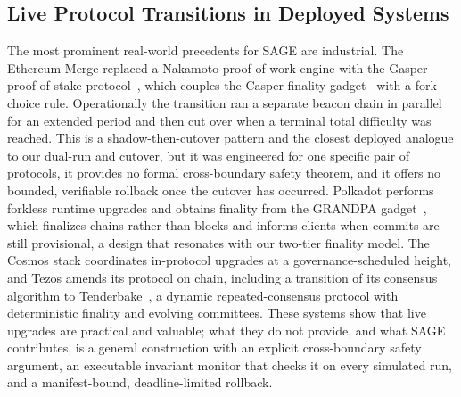 \documentclass[journal]{IEEEtran}
\theoremstyle{remark}
\begin{document}
\subsection{Live Protocol Transitions in Deployed Systems}
The most prominent real-world precedents for SAGE are industrial. The Ethereum Merge
replaced a Nakamoto proof-of-work engine with the Gasper proof-of-stake
protocol~\cite{gasper}, which couples the Casper finality gadget~\cite{casperffg} with a
fork-choice rule. Operationally the transition ran a separate beacon chain in parallel for
an extended period and then cut over when a terminal total difficulty was reached. This is a
shadow-then-cutover pattern and the closest deployed analogue to our dual-run and cutover,
but it was engineered for one specific pair of protocols, it provides no formal
cross-boundary safety theorem, and it offers no bounded, verifiable rollback once the cutover
has occurred. Polkadot performs forkless runtime upgrades and obtains finality from the
GRANDPA gadget~\cite{grandpa}, which finalizes chains rather than blocks and informs clients
when commits are still provisional, a design that resonates with our two-tier finality model.
The Cosmos stack coordinates in-protocol upgrades at a governance-scheduled height, and Tezos
amends its protocol on chain, including a transition of its consensus algorithm to
Tenderbake~\cite{tenderbake}, a dynamic repeated-consensus protocol with deterministic
finality and evolving committees. These systems show that live upgrades are practical and
valuable; what they do not provide, and what SAGE contributes, is a general construction with
an explicit cross-boundary safety argument, an executable invariant monitor that checks it on
every simulated run, and a manifest-bound, deadline-limited rollback.
\end{document}
